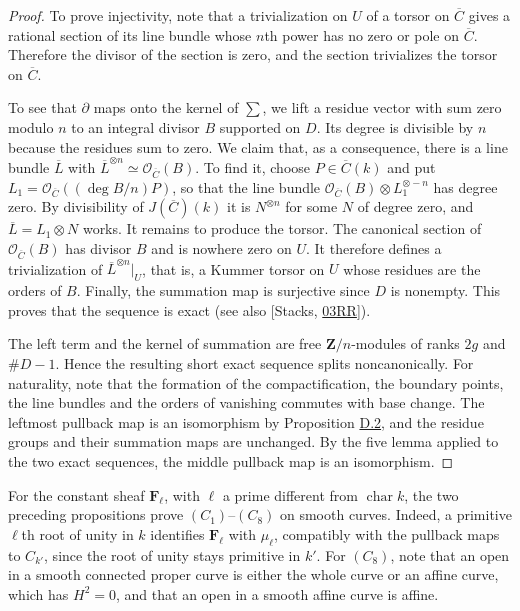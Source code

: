\documentclass[11pt]{article}
\begin{document}
\begin{proof}[{Proof}]
To prove injectivity, note that a trivialization on \(U\) of a torsor on \(\overline C\) gives a rational section of its line bundle whose \(n\)th power has no zero or pole on \(\overline C\).  Therefore the divisor of the section is zero, and the section trivializes the torsor on \(\overline C\).

To see that \(\partial\) maps onto the kernel of \(\sum\), we lift a residue vector with sum zero modulo \(n\) to an integral divisor \(B\) supported on \(D\). Its degree is divisible by \(n\) because the residues sum to zero. We claim that, as a consequence, there is a line bundle \(\overline L\) with \(\overline L^{\otimes n}\simeq\mathcal O_{\overline C}(B)\). To find it, choose \(P\in\overline C(k)\) and put \(L_1=\mathcal O_{\overline C}((\deg B/n)P)\), so that the line bundle \(\mathcal O_{\overline C}(B)\otimes L_1^{\otimes-n}\) has degree zero. By divisibility of \(J(\overline C)(k)\) it is \(N^{\otimes n}\) for some \(N\) of degree zero, and \(\overline L=L_1\otimes N\) works. It remains to produce the torsor. The canonical section of \(\mathcal O_{\overline C}(B)\) has divisor \(B\) and is nowhere zero on \(U\). It therefore defines a trivialization of \(\overline L^{\otimes n}|_U\), that is, a Kummer torsor on \(U\) whose residues are the orders of \(B\). Finally, the summation map is surjective since \(D\) is nonempty. This proves that the sequence is exact (see also [Stacks, \href{https://stacks.math.columbia.edu/tag/03RR}{03RR}]).

The left term and the kernel of summation are free \(\mathbf Z/n\)-modules of ranks \(2g\) and \(\#D-1\). Hence the resulting short exact sequence splits noncanonically. For naturality, note that the formation of the compactification, the boundary points, the line bundles and the orders of vanishing commutes with base change. The leftmost pullback map is an isomorphism by Proposition \hyperref[bp179]{D.2}, and the residue groups and their summation maps are unchanged. By the five lemma applied to the two exact sequences, the middle pullback map is an isomorphism.
\end{proof}

\label{bp186}%
For the constant sheaf \(\mathbf F_\ell\), with \(\ell\) a prime different from \(\operatorname{char}k\), the two preceding propositions prove \((C_1)\)–\((C_8)\) on smooth curves. Indeed, a primitive \(\ell\)th root of unity in \(k\) identifies \(\mathbf F_\ell\) with \(\mu_\ell\), compatibly with the pullback maps to \(C_{k'}\), since the root of unity stays primitive in \(k'\). For \((C_8)\), note that an open in a smooth connected proper curve is either the whole curve or an affine curve, which has \(H^2=0\), and that an open in a smooth affine curve is affine.
\end{document}

